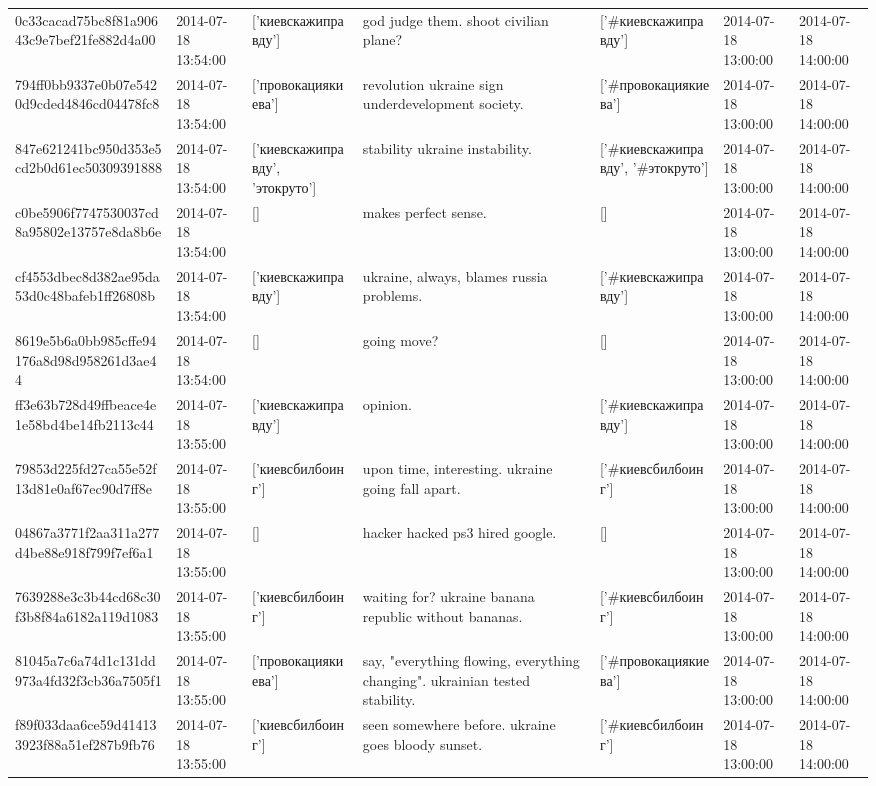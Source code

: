 \begin{tabular}{lllllll}
0c33cacad75bc8f81a90643c9e7bef21fe882d4a00 & 2014-07-18 13:54:00 & ['киевскажиправду'] & god judge them. shoot civilian plane? & ['#киевскажиправду'] & 2014-07-18 13:00:00 & 2014-07-18 14:00:00 \\
794ff0bb9337e0b07e5420d9cded4846cd04478fc8 & 2014-07-18 13:54:00 & ['провокациякиева'] & revolution ukraine sign underdevelopment society. & ['#провокациякиева'] & 2014-07-18 13:00:00 & 2014-07-18 14:00:00 \\
847e621241bc950d353e5cd2b0d61ec50309391888 & 2014-07-18 13:54:00 & ['киевскажиправду', 'этокруто'] & stability ukraine instability. & ['#киевскажиправду', '#этокруто'] & 2014-07-18 13:00:00 & 2014-07-18 14:00:00 \\
c0be5906f7747530037cd8a95802e13757e8da8b6e & 2014-07-18 13:54:00 & [] & makes perfect sense. & [] & 2014-07-18 13:00:00 & 2014-07-18 14:00:00 \\
cf4553dbec8d382ae95da53d0c48bafeb1ff26808b & 2014-07-18 13:54:00 & ['киевскажиправду'] & ukraine, always, blames russia problems. & ['#киевскажиправду'] & 2014-07-18 13:00:00 & 2014-07-18 14:00:00 \\
8619e5b6a0bb985cffe94176a8d98d958261d3ae44 & 2014-07-18 13:54:00 & [] & going move? & [] & 2014-07-18 13:00:00 & 2014-07-18 14:00:00 \\
ff3e63b728d49ffbeace4e1e58bd4be14fb2113c44 & 2014-07-18 13:55:00 & ['киевскажиправду'] & opinion. & ['#киевскажиправду'] & 2014-07-18 13:00:00 & 2014-07-18 14:00:00 \\
79853d225fd27ca55e52f13d81e0af67ec90d7ff8e & 2014-07-18 13:55:00 & ['киевсбилбоинг'] & upon time, interesting. ukraine going fall apart. & ['#киевсбилбоинг'] & 2014-07-18 13:00:00 & 2014-07-18 14:00:00 \\
04867a3771f2aa311a277d4be88e918f799f7ef6a1 & 2014-07-18 13:55:00 & [] & hacker hacked ps3 hired google. & [] & 2014-07-18 13:00:00 & 2014-07-18 14:00:00 \\
7639288e3c3b44cd68c30f3b8f84a6182a119d1083 & 2014-07-18 13:55:00 & ['киевсбилбоинг'] & waiting for? ukraine banana republic without bananas. & ['#киевсбилбоинг'] & 2014-07-18 13:00:00 & 2014-07-18 14:00:00 \\
81045a7c6a74d1c131dd973a4fd32f3cb36a7505f1 & 2014-07-18 13:55:00 & ['провокациякиева'] & say, "everything flowing, everything changing". ukrainian tested stability. & ['#провокациякиева'] & 2014-07-18 13:00:00 & 2014-07-18 14:00:00 \\
f89f033daa6ce59d414133923f88a51ef287b9fb76 & 2014-07-18 13:55:00 & ['киевсбилбоинг'] & seen somewhere before. ukraine goes bloody sunset. & ['#киевсбилбоинг'] & 2014-07-18 13:00:00 & 2014-07-18 14:00:00 \\

\end{tabular}
